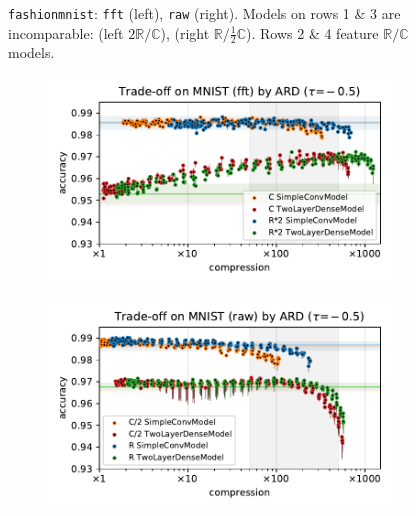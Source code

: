 \documentclass[a4paper,10pt,onecolumn]{article}
\newcommand{\real}{\mathbb{R}}
\newcommand{\cplx}{\mathbb{C}}
\begin{document}
\begin{figure}[b]
\begin{subfigure}[b]{0.5\columnwidth}
  \end{subfigure}
  \caption{%
    \texttt{fashionmnist}:
      \texttt{fft} (left), \texttt{raw} (right).
      Models on rows 1 \& 3 are incomparable: (left $2\real / \cplx$), (right $\real / \tfrac12\cplx$).
      Rows 2 \& 4 feature $\real / \cplx$ models.
  }
\end{figure}

\begin{figure}[b]
  \centering
  \begin{subfigure}[b]{0.5\columnwidth}
    \centering
    \includegraphics[width=\columnwidth]{figure__mnist-like__trade-off/appendix__cmp__ARD__mnist__fft__-0.5.pdf}
  \end{subfigure}%
  \begin{subfigure}[b]{0.5\columnwidth}
    \centering
    \includegraphics[width=\columnwidth]{figure__mnist-like__trade-off/appendix__cmp__ARD__mnist__raw__-0.5.pdf}
  \end{subfigure} \\%

\end{figure}
\end{document}
